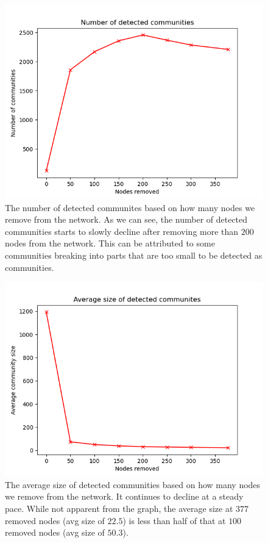 \documentclass[9pt,twocolumn,twoside]{pnas-new}
\begin{document}
\begin{figure}[!htbp]
    \centering
    \includegraphics[width=1\linewidth]{num_coms_2.png}
    \caption{The number of detected communites based on how many nodes we remove from the network.
    As we can see, the number of detected communities starts to slowly decline after removing more than $200$ nodes from the network.
    This can be attributed to some communities breaking into parts that are too small to be detected as communities.}
    \label{num_coms_2}
\end{figure}

\begin{figure}[!htbp]
    \centering
    \includegraphics[width=1\linewidth]{avg_size_2.png}
    \caption{The average size of detected communities based on how many nodes we remove from the network.
    It continues to decline at a steady pace.
    While not apparent from the graph, the average size at $377$ removed nodes (avg size of $22.5$) is less than half of that at $100$ removed nodes (avg size of $50.3$).
    }
    \label{avg_size_2}
\end{figure}
\end{document}
